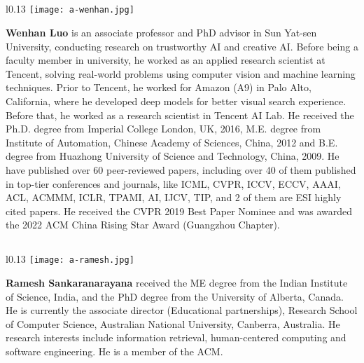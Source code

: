 \documentclass[review,12pt, 3p]{elsarticle}
\begin{document}
\subsection*{  } \setlength\intextsep{0pt} \begin{wrapfigure}{l}{0.13\textwidth}
        \centering
        \texttt{[image: a-wenhan.jpg]}
    \end{wrapfigure}
    \noindent \textbf{Wenhan Luo} is an associate professor and PhD advisor in Sun Yat-sen University, conducting research on trustworthy AI and creative AI. Before being a faculty member in university, he worked as an applied research scientist at Tencent, solving real-world problems using computer vision and machine learning techniques. Prior to Tencent, he worked for Amazon (A9) in Palo Alto, California, where he developed deep models for better visual search experience. Before that, he worked as a research scientist in Tencent AI Lab.  He received the Ph.D. degree from Imperial College London, UK, 2016, M.E. degree from Institute of Automation, Chinese Academy of Sciences, China, 2012 and B.E. degree from Huazhong University of Science and Technology, China, 2009. He have published over 60 peer-reviewed papers, including over 40 of them published in top-tier conferences and journals, like ICML, CVPR, ICCV, ECCV, AAAI, ACL, ACMMM, ICLR, TPAMI, AI, IJCV, TIP, and 2 of them are ESI highly cited papers. He received the CVPR 2019 Best Paper Nominee and was awarded the 2022 ACM China Rising Star Award (Guangzhou Chapter).

\subsection*{  } \setlength\intextsep{0pt} \begin{wrapfigure}{l}{0.13\textwidth}
        \centering
        \texttt{[image: a-ramesh.jpg]}
    \end{wrapfigure}
    \noindent \textbf{Ramesh Sankaranarayana}  received the ME degree from the Indian Institute of Science, India, and the PhD degree from the University of Alberta, Canada. He is currently the associate director (Educational partnerships), Research School of Computer Science, Australian National University, Canberra, Australia. He research interests include information retrieval, human-centered computing and software engineering. He is a member of the ACM.
\end{document}
